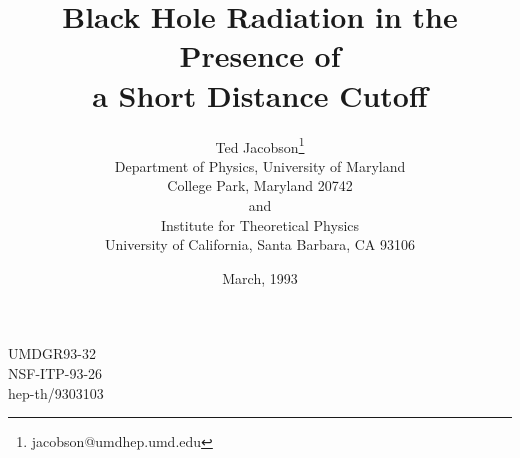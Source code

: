 





\def\sq{{\vbox {\hrule height 0.6pt\hbox{\vrule width 0.6pt\hskip 3pt
\vbox{\vskip 6pt}\hskip 3pt \vrule width 0.6pt}\hrule height 0.6pt}}}
\def\gtwid{\raise.3ex\hbox{$>$\kern-.75em\lower1ex\hbox{$\sim$}}}
\def\ltwid{\raise.3ex\hbox{$<$\kern-.75em\lower1ex\hbox{$\sim$}}}

\def\o{\omega}
\def\obar{\bar{\omega}}
\def\ubar{\bar{u}}
\def\poubar{P_{\obar\ubar}}
\def\toubar{T_{\obar\ubar}}
\def\roubar{R_{\obar\ubar}}
\def\la{\langle}
\def\ra{\rangle}
\def\pastI{{\cal I}^-}
\def\futI{{\cal I}^+}
\def\cmax{C_{\rm max}}
\def\cmin{C_{\rm min}}


\title{Black Hole Radiation in the Presence of \\a Short Distance
Cutoff}%
\author{Ted Jacobson\thanks{jacobson@umdhep.umd.edu}\\
Department of Physics, University of Maryland\\
College Park, Maryland 20742\\
and\\
Institute for Theoretical Physics\\
University of California, Santa Barbara, CA 93106}
\date{March, 1993}
\maketitle

\vspace{-12cm}
\begin{flushright}
UMDGR93-32\\NSF-ITP-93-26\\hep-th/9303103
\end{flushright}
\vspace{10cm}

